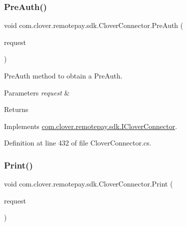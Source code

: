 \subsubsection{\texorpdfstring{Pre\+Auth()}{PreAuth()}}
{\footnotesize\ttfamily void com.\+clover.\+remotepay.\+sdk.\+Clover\+Connector.\+Pre\+Auth (\begin{DoxyParamCaption}\item[{\hyperlink{classcom_1_1clover_1_1remotepay_1_1sdk_1_1_pre_auth_request}{Pre\+Auth\+Request}}]{request }\end{DoxyParamCaption})}



Pre\+Auth method to obtain a Pre\+Auth. 


\begin{DoxyParams}{Parameters}
{\em request} & \\
\hline
\end{DoxyParams}
\begin{DoxyReturn}{Returns}

\end{DoxyReturn}


Implements \hyperlink{interfacecom_1_1clover_1_1remotepay_1_1sdk_1_1_i_clover_connector_aa41978ea2b8048ff23ab931752129eb9}{com.\+clover.\+remotepay.\+sdk.\+I\+Clover\+Connector}.



Definition at line 432 of file Clover\+Connector.\+cs.

\mbox{\label{classcom_1_1clover_1_1remotepay_1_1sdk_1_1_clover_connector_aefaa2e93fe6c7b01f6b271a42e684132}} 
\subsubsection{\texorpdfstring{Print()}{Print()}}
{\footnotesize\ttfamily void com.\+clover.\+remotepay.\+sdk.\+Clover\+Connector.\+Print (\begin{DoxyParamCaption}\item[{\hyperlink{classcom_1_1clover_1_1remotepay_1_1sdk_1_1_print_request}{Print\+Request}}]{request }\end{DoxyParamCaption})}



